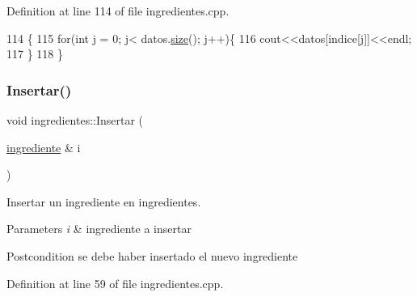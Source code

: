 Definition at line 114 of file ingredientes.\+cpp.


\begin{DoxyCode}
114                                   \{
115     \textcolor{keywordflow}{for}(\textcolor{keywordtype}{int} j = 0; j< datos.\hyperlink{classVD_a411ad026db1c8e0617d9031f1f1017a5}{size}(); j++)\{
116         cout<<datos[indice[j]]<<endl;
117     \}
118 \}
\end{DoxyCode}
\mbox{\label{classingredientes_abbf5ea48179d79c13e5abd6c09393ada}} 
\subsubsection{\texorpdfstring{Insertar()}{Insertar()}}
{\footnotesize\ttfamily void ingredientes\+::\+Insertar (\begin{DoxyParamCaption}\item[{\hyperlink{classingrediente}{ingrediente} \&}]{i }\end{DoxyParamCaption})}



Insertar un ingrediente en ingredientes. 


\begin{DoxyParams}{Parameters}
{\em i} & ingrediente a insertar \\
\hline
\end{DoxyParams}
\begin{DoxyPostcond}{Postcondition}
se debe haber insertado el nuevo ingrediente 
\end{DoxyPostcond}


Definition at line 59 of file ingredientes.\+cpp.


